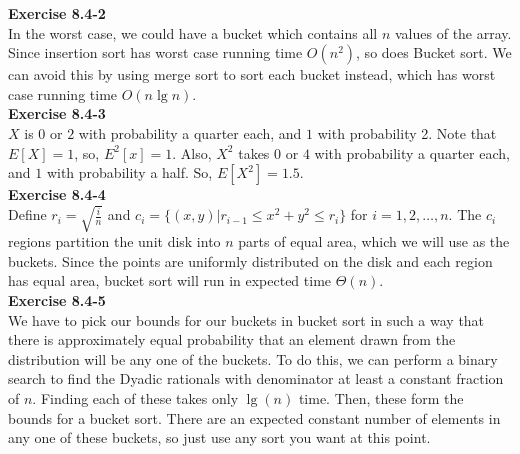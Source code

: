 \documentclass{article}
\begin{document}
\noindent\textbf{Exercise 8.4-2}\\

In the worst case, we could have a bucket which contains all $n$ values of the array.   Since insertion sort has worst case running time $O(n^2)$, so does Bucket sort.  We can avoid this by using merge sort to sort each bucket instead, which has worst case running time $O(n \lg n)$.\\

\noindent\textbf{Exercise 8.4-3}\\

$X$ is $0$ or $2$ with probability a quarter each, and $1$ with probability 2. Note that $E[X]=1$, so, $E^2[x] = 1$. Also, $X^2$ takes $0$ or $4$ with probability a quarter each, and $1$ with probability a half. So, $E[X^2] = 1.5$.\\

\noindent\textbf{Exercise 8.4-4}\\

Define $r_i = \sqrt{\frac{i}{n}}$ and $c_i = \{(x,y) | r_{i-1} \leq x^2 + y^2 \leq r_i\}$ for $i = 1, 2, \ldots, n$.  The $c_i$ regions partition the unit disk into $n$ parts of equal area, which we will use as the buckets. Since the points are uniformly distributed on the disk and each region has equal area, bucket sort will run in expected time $\Theta(n)$. \\

\noindent\textbf{Exercise 8.4-5}\\

We have to pick our bounds for our buckets in bucket sort in such a way that there is approximately equal probability that an element drawn from the distribution will be any one of the buckets. To do this, we can perform a binary search to find the Dyadic rationals with denominator at least a constant fraction of $n$. Finding each of these takes only $\lg(n)$ time. Then, these form the bounds for a bucket sort. There are an expected constant number of elements in any one of these buckets, so just use any sort you want at this point.
\end{document}
